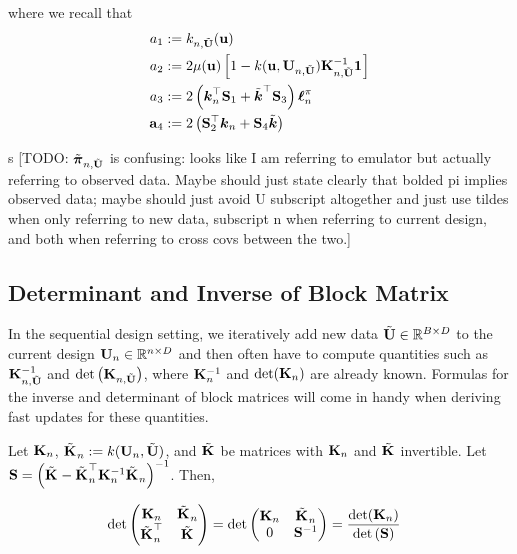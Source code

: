\documentclass[12pt]{article}
\begin{document}
where we recall that 
\begin{align*}
a_1 &:= \logUnPostKerPred[\designIdx, \batchMat](\bpar) \\
a_2 &:= 2\logUnPostMean(\bpar) \left[1 -  \logUnPostKer(\bpar, \designMat[\designIdx, \batchMat]) \KerMat[\designIdx, \batchMat]^{-1}\oneVec\right] \\
a_3 &:= 2\left(\boldsymbol{\logUnPostKer}_{\designIdx}^\top \bS_1 + \tilde{\boldsymbol{\logUnPostKer}}^\top \bS_3 \right) \logUnPostObs  \\
\ba_4 &:= 2\left(\bS_2^\top \boldsymbol{\logUnPostKer}_{\designIdx} + \bS_4 \tilde{\boldsymbol{\logUnPostKer}} \right) 
\end{align*}



s
[TODO: $\tilde{\boldsymbol{\postDens}}_{\designIdx, \batchMat}$ is confusing: looks like I am referring to emulator but actually referring to observed data. Maybe 
should just state clearly that bolded pi implies observed data; maybe should just avoid U subscript altogether and just use tildes when only referring to 
new data, subscript n when referring to current design, and both when referring to cross covs between the two.]


\subsection{Determinant and Inverse of Block Matrix}
In the sequential design setting, we iteratively add new data $\batchMat \in \R^{\Nbatch \times \Npar}$ to the current design 
$\designMat \in \R^{\designIdx \times \Npar}$ and then often have to compute quantities such as 
$\KerMat[\designIdx, \batchMat]^{-1}$ and $\det\left(\KerMat[\designIdx, \batchMat]\right)$, where $\KerMat^{-1}$ and $\det(\KerMat)$ are already known. 
Formulas for the inverse and determinant of block matrices will come in handy 
when deriving fast updates for these quantities. 

Let $\KerMat$, $\tilde{\KerMat[]}_{\designIdx} := \GPKer(\designMat, \batchMat)$, and $\tilde{\KerMat[]}$ be matrices with $\KerMat$ and 
$\tilde{\KerMat[]}$ invertible. Let  $\mathbf{S} = \left(\tilde{\KerMat[]} - \tilde{\KerMat[]}_{\designIdx}^\top \KerMat^{-1} \tilde{\KerMat[]}_{\designIdx} \right)^{-1}$. Then,
 
\begin{align}
&\det\begin{pmatrix} \KerMat & \tilde{\KerMat[]}_{\designIdx}  \\ \tilde{\KerMat[]}_{\designIdx} ^\top & \tilde{\KerMat[]} \end{pmatrix} 
= \det \begin{pmatrix} \KerMat & \tilde{\KerMat[]}_{\designIdx} \\ 0 & \mathbf{S}^{-1}   \end{pmatrix} 
= \frac{\det(\KerMat)}{\det\left(\mathbf{S}\right)} \label{block_determinant}
\end{align}
\end{document}
